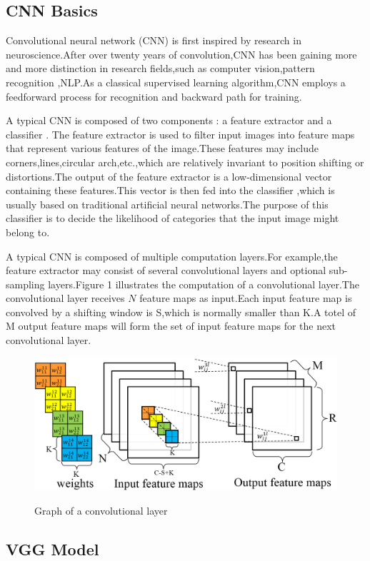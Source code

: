 \documentclass[10pt,a4paper]{article}
\begin{document}
	\subsection{CNN Basics}
	Convolutional neural network (CNN) is first inspired by research in 
	neuroscience.After over twenty years of convolution,CNN has been gaining 
	more and more distinction in research fields,such as computer vision,pattern
	recognition ,NLP.As a classical supervised learning algorithm,CNN employs 
	a feedforward process for recognition and backward path for training.
	
	
	A typical CNN is composed of two components : a feature extractor and a classifier . The feature extractor is used to filter input images into 
	feature maps that represent various features of the image.These features may 
	include corners,lines,circular arch,etc.,which are relatively invariant to
	position shifting or distortions.The output of the feature extractor is a low-dimensional vector containing these features.This vector is then fed into the classifier ,which is usually based on traditional artificial neural 
	networks.The purpose of this classifier is to decide the likelihood of 
	categories that the input image might belong to.
	
	A typical CNN is composed of multiple computation layers.For example,the feature extractor may consist of several convolutional layers and 
	optional sub-sampling layers.Figure 1 illustrates the computation of a convolutional layer.The convolutional layer receives $N$ feature maps as input.Each input feature map is convolved by a shifting window is S,which 
	is normally smaller than K.A totel of M output feature maps will form the 
	set of input feature maps for the next convolutional layer.  
	
	\begin{figure}[h]
		\centering
		{\includegraphics[width=0.8\linewidth]{convolve.png}}
		\caption{Graph of a convolutional layer}
	\end{figure}
	\subsection{VGG Model}
\end{document}
